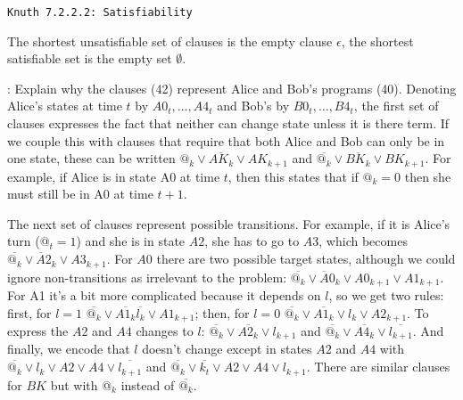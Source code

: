 \topglue 0.5in
\centerline{\tt Knuth 7.2.2.2: Satisfiability}
\vskip 0.3in

 The shortest unsatisfiable set of clauses is the
empty clause $\epsilon$, the shortest satisfiable set is the empty set $\emptyset$.

: Explain why the clauses (42) represent Alice and Bob's
programs (40).\hfil\break
Denoting Alice's states at time $t$ by $A0_t, \ldots, A4_t$ and Bob's by $B0_t, \ldots, B4_t$,
the first set of clauses expresses the fact that neither can change state unless it is there term.
If we couple this with clauses that require that both Alice and Bob can only be in one
state, these can be written $@_k \vee \overline{AK_{k}} \vee AK_{k+1}$
and $\overline{@_k} \vee \overline{BK_{k}} \vee BK_{k+1}$.  For example, if Alice is in state
A0 at time $t$, then this states that if $@_k = 0$ then she must still be in A0 at
time $t+1$.

The next set of clauses represent possible transitions.  For example, if it is
Alice's turn ($@_t = 1$) and she is in state $A2$, she has to go to $A3$, which becomes
$\overline{@_k} \vee {\overline A2_k} \vee A3_{k+1}$.  For $A0$ there are two possible
target states, although we could ignore non-transitions as irrelevant to the problem:
$\overline{@_k} \vee {\overline A0_k} \vee A0_{k+1} \vee A1_{k+1}$.  For A1 it's a bit more
complicated because it depends on $l$, so we get two rules: first, for $l=1$
$\overline{@_k} \vee \overline{A1_{k}} \overline{l_k} \vee A1_{k+1}$; then, for $l=0$
$\overline{@_k} \vee \overline{A1_{k}} \vee l_k \vee A2_{k+1}$.  To express the $A2$ and $A4$
changes to $l$: $\overline{@_k} \vee \overline{A2_k} \vee l_{k+1}$ and
$\overline{@_k} \vee \overline{A4_k} \vee \overline{l_{k+1}}$.  And finally, we encode
that $l$ doesn't change except in states $A2$ and $A4$ with
$\overline{@_k} \vee l_k \vee A2 \vee A4 \vee \overline{l_{k+1}}$
and $\overline{@_k} \vee \overline{k_t} \vee A2 \vee A4 \vee l_{k+1}$.
There are similar clauses for $BK$ but with $@_k$ instead of $\overline{@_k}$.

